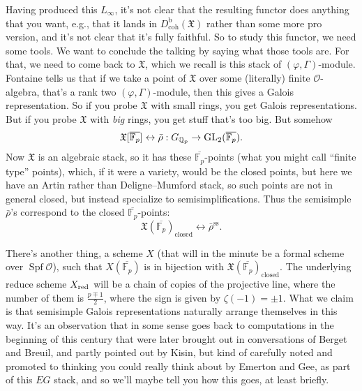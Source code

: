 \documentclass[reqno]{amsart} 
\begin{document}
Having produced this $L_\infty$, it's not clear that the resulting functor does anything that you want, e.g., that it lands in $D_{\mathrm{coh}}^{\mathrm{b}}(\mathfrak{X})$ rather than some more pro version, and it's not clear that it's fully faithful.  So to study this functor, we need some tools.  We want to conclude the talking by saying what those tools are.  For that, we need to come back to $\mathfrak{X}$, which we recall is this stack of $(\varphi, \Gamma)$-module.  Fontaine tells us that if we take a point of $\mathfrak{X}$ over some (literally) finite $\mathcal{O}$-algebra, that's a rank two $(\varphi, \Gamma)$-module, then this gives a Galois representation.  So if you probe $\mathfrak{X}$ with small rings, you get Galois representations.  But if you probe $\mathfrak{X}$ with \emph{big} rings, you get stuff that's too big.  But somehow
\begin{equation*}
  \mathfrak{X}[\overline{\mathbb{F}_p}]
  \leftrightarrow
  \bar{\rho} : G_{\mathbb{Q}_p} \rightarrow \operatorname{GL}_2(\overline{\mathbb{F}_p}).
\end{equation*}
Now $\mathfrak{X}$ is an algebraic stack, so it has these $\overline{\mathbb{F}_p}$-points (what you might call ``finite type'' points), which, if it were a variety, would be the closed points, but here we have an Artin rather than Deligne--Mumford stack, so such points are not in general closed, but instead specialize to semisimplifications.  Thus the semisimple $\bar{\rho}$'s correspond to the closed $\overline{\mathbb{F}_p}$-points:
\begin{equation*}
  \mathfrak{X}(\overline{\mathbb{F}_p})_{\mathrm{closed}}
  \leftrightarrow \bar{\rho}^{\mathrm{ss}}.
\end{equation*}

There's another thing, a scheme $X$ (that will in the minute be a formal scheme over $\operatorname{Spf} \mathcal{O}$), such that $X(\overline{\mathbb{F}_p})$ is in bijection with $\mathfrak{X}(\overline{\mathbb{F}_p})_{\mathrm{closed}}$.  The underlying reduce scheme $X_{\operatorname{red}}$ will be a chain of copies of the projective line, where the number of them is $\tfrac{p \mp 1}{2}$, where the sign is given by $\zeta(- 1) = \pm 1$.  What we claim is that semisimple Galois representations naturally arrange themselves in this way.  It's an observation that in some sense goes back to computations in the beginning of this century that were later brought out in conversations of Berget and Breuil, and partly pointed out by Kisin, but kind of carefully noted and promoted to thinking you could really think about by Emerton and Gee, as part of this $E G$ stack, and so we'll maybe tell you how this goes, at least briefly.
\end{document}
